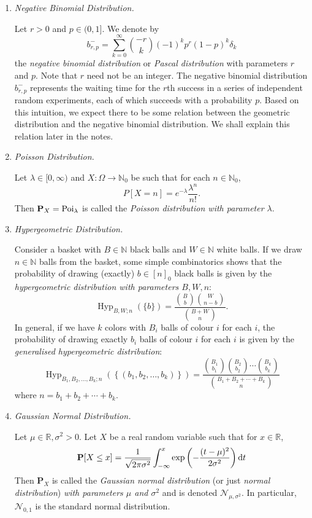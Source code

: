 \begin{enumerate}
    \item \textit{Negative Binomial Distribution.}
    
    Let $r>0$ and $p\in(0,1]$. We denote by
    $$b^{-}_{r,p}=\sum_{k=0}^\infty \binom{-r}{k}(-1)^kp^r(1-p)^k\delta_k$$
    the \textit{negative binomial distribution} or \textit{Pascal distribution} with parameters $r$ and $p$. Note that $r$ need not be an integer.
    The negative binomial distribution $b^-_{r,p}$ represents the waiting time for the $r$th success in a series of independent random experiments, each of which succeeds with a probability $p$. Based on this intuition, we expect there to be some relation between the geometric distribution and the negative binomial distribution. We shall explain this relation later in the notes.
    
    
    \item \textit{Poisson Distribution.}
    
    Let $\lambda\in[0,\infty)$ and $X:\Omega\to\mathbb{N}_0$ be such that for each $n\in\mathbb{N}_0$,
    $$P[X=n]=e^{-\lambda}\frac{\lambda^n}{n!}.$$
    Then $\textbf{P}_X=\operatorname{Poi}_\lambda$ is called the \textit{Poisson distribution with parameter $\lambda$}.
    
    \item \textit{Hypergeometric Distribution.}
    
    Consider a basket with $B\in\mathbb{N}$ black balls and $W\in\mathbb{N}$ white balls. If we draw $n\in\mathbb{N}$ balls from the basket, some simple combinatorics shows that the probability of drawing (exactly) $b\in[n]_0$ black balls is given by the \textit{hypergeometric distribution with parameters $B,W,n$}:
    $$\operatorname{Hyp}_{B,W;n}(\{b\})=\frac{\binom{B}{b}\binom{W}{n-b}}{\binom{B+W}{n}}.$$
    In general, if we have $k$ colors with $B_i$ balls of colour $i$ for each $i$, the probability of drawing exactly $b_i$ balls of colour $i$ for each $i$ is given by the \textit{generalised hypergeometric distribution}:
    $$\operatorname{Hyp}_{B_1,B_2,\ldots,B_k;n}(\left\{(b_1,b_2,\ldots,b_k)\right\}) = \frac{\binom{B_1}{b_1}\binom{B_2}{b_2}\cdots\binom{B_k}{b_k}}{\binom{B_1+B_2+\cdots+B_k}{n}}$$
    where $n=b_1+b_2+\cdots+b_k$.
    
    \item \textit{Gaussian Normal Distribution.}
    
    Let $\mu\in\mathbb{R}, \sigma^2>0$. Let $X$ be a real random variable such that for $x\in\mathbb{R}$,
    $$\textbf{P}[X\leq x]=\frac{1}{\sqrt{2\pi\sigma^2}}\int_{-\infty}^x \exp\left(-\frac{(t-\mu)^2}{2\sigma^2}\right)\operatorname{d}\!{t}$$
    Then $\textbf{P}_X$ is called the \textit{Gaussian normal distribution} (or just \textit{normal distribution}) \textit{with parameters $\mu$ and $\sigma^2$} and is denoted $\mathcal{N}_{\mu,\sigma^2}$. In particular, $\mathcal{N}_{0,1}$ is the standard normal distribution. 
    

\end{enumerate}
